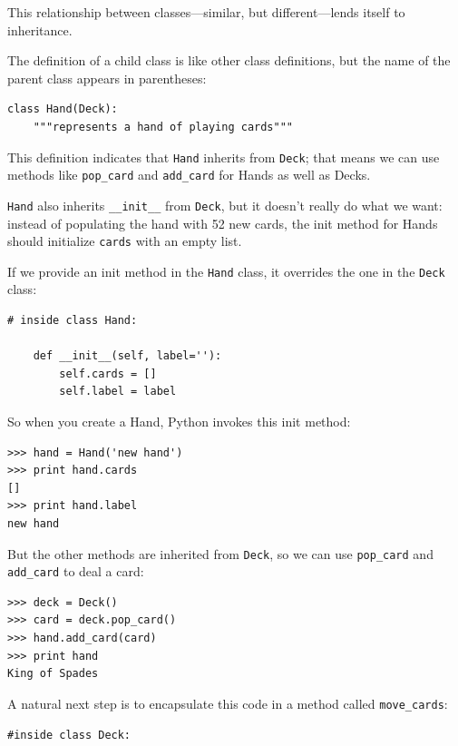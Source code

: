 \documentclass[10pt]{book}
\begin{document}
{This relationship between classes---similar, but different---lends
itself to inheritance.  

The definition of a child class is like other class definitions,
but the name of the parent class appears in parentheses:


\beforeverb
\begin{verbatim}
class Hand(Deck):
    """represents a hand of playing cards"""
\end{verbatim}
\afterverb
%
This definition indicates that {\tt Hand} inherits from {\tt Deck};
that means we can use methods like \verb"pop_card" and \verb"add_card"
for Hands as well as Decks.

{\tt Hand} also inherits \verb"__init__" from {\tt Deck}, but
it doesn't really do what we want: instead of populating the hand
with 52 new cards, the init method for Hands should initialize
{\tt cards} with an empty list.


If we provide an init method in the {\tt Hand} class, it overrides the
one in the {\tt Deck} class:

\beforeverb
\begin{verbatim}
# inside class Hand:

    def __init__(self, label=''):
        self.cards = []
        self.label = label
\end{verbatim}
\afterverb
%
So when you create a Hand, Python invokes this init method:

\beforeverb
\begin{verbatim}
>>> hand = Hand('new hand')
>>> print hand.cards
[]
>>> print hand.label
new hand
\end{verbatim}
\afterverb
%
But the other methods are inherited from {\tt Deck}, so we can use
\verb"pop_card" and \verb"add_card" to deal a card:

\beforeverb
\begin{verbatim}
>>> deck = Deck()
>>> card = deck.pop_card()
>>> hand.add_card(card)
>>> print hand
King of Spades
\end{verbatim}
\afterverb
%
A natural next step is to encapsulate this code in a method
called \verb"move_cards":


\beforeverb
\begin{verbatim}
#inside class Deck:


\end{verbatim}}
\end{document}
